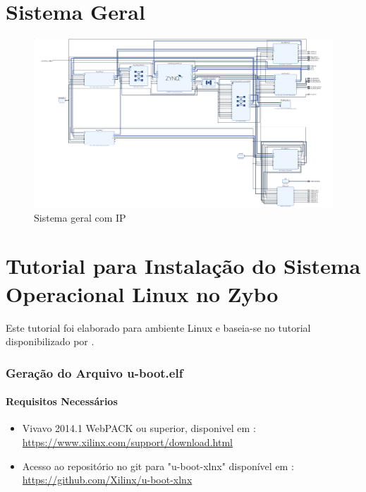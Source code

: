 \begin{anexosenv}

\partanexos

\chapter{Sistema Geral}
\begin{figure}[h]
	\centering
	\includegraphics[keepaspectratio=true,scale=0.32, angle=90]{figuras/base-zybo.png}
	\caption{Sistema geral com IP}
	\label{sitemageral}
\end{figure}


\chapter{Tutorial para Instalação do Sistema Operacional Linux no Zybo}

 Este tutorial foi elaborado para ambiente Linux e baseia-se no tutorial disponibilizado por \cite{tutorialzybo}.
 
 \subsection{Geração do Arquivo u-boot.elf}
 \subsubsection{Requisitos Necessários}
\begin{itemize}
\item Vivavo 2014.1 WebPACK ou superior, disponivel em : \url{https://www.xilinx.com/support/download.html}
\item Acesso ao repositório no git para "u-boot-xlnx" disponível em : \url{https://github.com/Xilinx/u-boot-xlnx} 

\end{itemize} 

\end{anexosenv}
